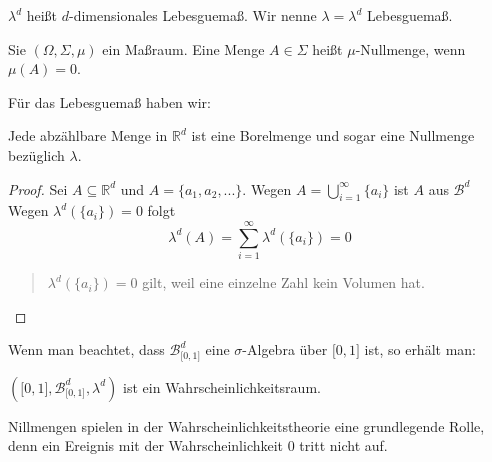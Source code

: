 \begin{definition}
$\lambda^d$ heißt $d$-dimensionales Lebesguemaß. Wir nenne $\lambda = \lambda^d$ Lebesguemaß.
\end{definition}

\begin{definition}
Sie $(\Omega,\Sigma,\mu)$ ein Maßraum. Eine Menge $A \in \Sigma $ heißt $\mu$-Nullmenge, wenn $\mu(A)=0$.
\end{definition}

Für das Lebesguemaß haben wir:

\begin{theorem}
Jede abzählbare Menge in $\mathbb R^d$ ist eine Borelmenge und sogar eine Nullmenge bezüglich $\lambda$.
\end{theorem}

\begin{proof}
Sei $A \subseteq \mathbb R^d$ und $A=\{a_1,a_2, ...  \}$. Wegen $A=\bigcup\limits_{i=1}^\infty \{a_i\}$ ist $A$ aus $\mathcal B^d$ %
Wegen $\lambda^d(\{a_i\})=0$ folgt
$$ \lambda^d(A)=\sum\limits_{i=1}^\infty \lambda^d(\{a_i\}) = 0 $$
\begin{quote}
$\lambda^d(\{a_i\})=0$ gilt, weil eine einzelne Zahl kein Volumen hat.
\end{quote}
\end{proof}

Wenn man beachtet, dass $\mathcal B^d _{\lbrack 0,1\rbrack}$ eine $\sigma$-Algebra über $\lbrack 0,1 \rbrack$ ist, so erhält man:
\begin{proposition}
$(\lbrack 0,1 \rbrack,\mathcal B^d _{\lbrack 0,1\rbrack}, \lambda^d)$ ist ein Wahrscheinlichkeitsraum.
\end{proposition}
Nillmengen spielen in der Wahrscheinlichkeitstheorie eine grundlegende Rolle, denn ein Ereignis mit der Wahrscheinlichkeit %
0 tritt nicht auf.

